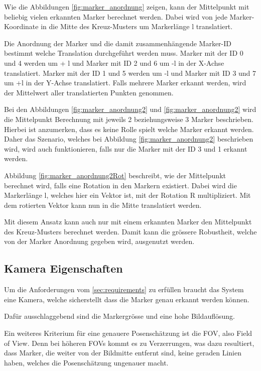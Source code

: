 Wie die Abbildungen \ref{fig:marker_anordnung} zeigen, kann der Mittelpunkt mit beliebig vielen erkannten Marker berechnet werden.
Dabei wird von jede Marker-Koordinate in die Mitte des Kreuz-Musters um Markerlänge l translatiert.

Die Anordnung der Marker und die damit zusammenhängende Marker-ID bestimmt welche Translation durchgeführt werden muss. 
Marker mit der ID 0 und 4 werden um + l und Marker mit ID 2 und 6 um -l in der X-Achse translatiert. 
Marker mit der ID 1 und 5 werden um -l und Marker mit ID 3 und 7 um +l in der Y-Achse translatiert. 
Falls mehrere Marker erkannt werden, wird der Mittelwert aller translatierten Punkten genommen.

Bei den Abbildungen \ref{fig:marker_anordnung2} und \ref{fig:marker_anordnung2} wird die Mittelpunkt Berechnung mit jeweils 2 beziehungsweise 3 Marker beschrieben.
Hierbei ist anzumerken, dass es keine Rolle spielt welche Marker erkannt werden. 
Daher das Szenario, welches bei Abbildung \ref{fig:marker_anordnung2} beschrieben wird, wird auch funktionieren, falls nur die Marker mit der ID 3 und 1 erkannt werden.

Abbildung \ref{fig:marker_anordnung2Rot} beschreibt, wie der Mittelpunkt berechnet wird, falls eine Rotation in den Markern existiert.
Dabei wird die Markerlänge l, welches hier ein Vektor ist, mit der Rotation R multipliziert. 
Mit dem rotierten Vektor kann nun in die Mitte translatiert werden.  

Mit diesem Ansatz kann auch nur mit einem erkannten Marker den Mittelpunkt des Kreuz-Musters berechnet werden. 
Damit kann die grössere Robustheit, welche von der Marker Anordnung gegeben wird, ausgenutzt werden.


\subsection{Kamera Eigenschaften}

Um die Anforderungen vom \ref{sec:requirements} zu erfüllen braucht das System eine Kamera, welche sicherstellt dass die Marker genau erkannt werden können.

Dafür ausschlaggebend sind die Markergrösse und eine hohe Bildauflösung\cite{noauthor_designing_2020}. 

Ein weiteres Kriterium für eine genauere Posenschätzung ist die FOV, also Field of View. 
Denn bei höheren FOVs kommt es zu Verzerrungen, was dazu resultiert, dass Marker, die weiter von der Bildmitte entfernt sind, keine geraden Linien haben, welches die Posenschätzung ungenauer macht.


